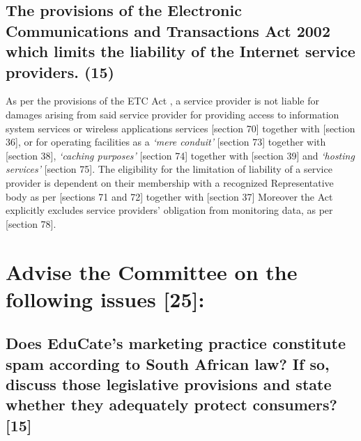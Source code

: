 \documentclass[11pt]{article}
\begin{document}
\subsection{The provisions of the Electronic Communications and Transactions Act 2002 which limits the liability of the Internet service providers. (15)}
\label{sec:org7bb4643}

As per the provisions of the ETC Act \cite{rsa02_elect_comm_trans_act}, a service
provider is not liable for damages arising from said service provider for
providing access to information system services or wireless applications
services [section 70]\cite{rsa02_elect_comm_trans_act} together with [section
36]\cite{rsa12_elect_comm_trans_amend_bill}, or for operating facilities as a
\emph{`mere conduit'} [section 73]\cite{rsa02_elect_comm_trans_act} together with
[section 38]\cite{rsa12_elect_comm_trans_amend_bill}, \emph{`caching purposes'}
[section 74]\cite{rsa02_elect_comm_trans_act} together with [section
39]\cite{rsa12_elect_comm_trans_amend_bill} and \emph{`hosting services'} [section
75]\cite{rsa02_elect_comm_trans_act}. The eligibility for the limitation of
liability of a service provider is dependent on their membership with a
recognized Representative body as per [sections 71 and
72]\cite{rsa02_elect_comm_trans_act} together with [section
37]\cite{rsa12_elect_comm_trans_amend_bill} Moreover the Act explicitly excludes
service providers' obligation from monitoring data, as per [section
78]\cite{rsa02_elect_comm_trans_act}.

\section{Advise the Committee on the following issues [25]:}
\label{sec:org5eb8862}

\subsection{Does EduCate's marketing practice constitute spam according to South African law? If so, discuss those legislative provisions and state whether they adequately protect consumers? [15]}
\label{sec:orgfa6295b}
\end{document}
